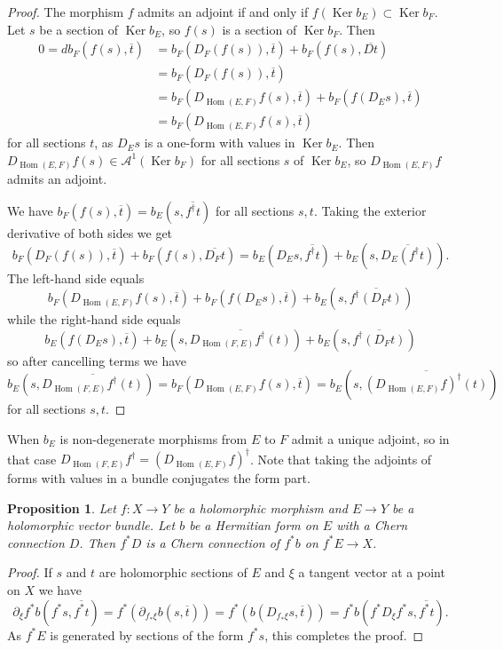 \documentclass[10pt,a4paper]{amsart}
\newtheorem{prop}[theo]{Proposition}
\theoremstyle{definition}
\newcommand{\cc}[1]{\mathcal{#1}}
\def\ov#1{\overline{#1}}
\DeclareMathOperator{\Ker}{Ker}
\DeclareMathOperator{\Hom}{Hom}
\begin{document}
\begin{proof}
The morphism $f$ admits an adjoint if and only if $f(\Ker b_E) \subset \Ker b_F$. Let $s$ be a section of $\Ker b_E$, so $f(s)$ is a section of $\Ker b_F$. Then
\begin{align*}
0 = d b_F(f(s), \ov t)
&= b_F(D_F(f(s)), \ov t) + b_F(f(s), \ov{Dt})
\\
&= b_F(D_F(f(s)), \ov t)
\\
&= b_F(D_{\Hom(E,F)}f(s), \ov t) + b_F(f(D_Es), \ov t)
\\
&= b_F(D_{\Hom(E,F)}f(s), \ov t)
\end{align*}
for all sections $t$, as $D_Es$ is a one-form with values in $\Ker b_E$. Then $D_{\Hom(E,F)} f(s) \in \cc A^1(\Ker b_F)$ for all sections $s$ of $\Ker b_E$, so $D_{\Hom(E,F)}f$ admits an adjoint.

We have $b_F(f(s), \ov{t}) = b_E(s, \ov{f^\dagger t})$ for all sections $s,t$. Taking the exterior derivative of both sides we get
\[
b_F(D_F(f(s)), \ov t) + b_F(f(s), \ov{D_F t})
= b_E(D_E s, \ov {f^\dagger t}) + b_E(s, \ov{D_E(f^\dagger t)}).
\]
The left-hand side equals
\[
b_F(D_{\Hom(E,F)}f(s), \ov t)
+ b_F(f(D_Es), \ov t)
+ b_E(s, \ov{f^\dagger(D_F t)})
\]
while the right-hand side equals
\[
b_E(f(D_E s), \ov t)
+ b_E(s, \ov{D_{\Hom(F,E)}f^\dagger(t)})
+ b_E(s, \ov{f^\dagger(D_F t)})
\]
so after cancelling terms we have
\[
b_E(s, \ov{D_{\Hom(F,E)}f^\dagger(t)})
= b_F(D_{\Hom(E,F)}f(s), \ov t)
= b_E(s, \ov{(D_{\Hom(E,F)}f)^\dagger(t)})
\]
for all sections $s,t$.
\end{proof}

When $b_E$ is non-degenerate morphisms from $E$ to $F$ admit a unique adjoint, so in that case $D_{\Hom(F,E)}f^\dagger = (D_{\Hom(E,F)}f)^\dagger$. Note that taking the adjoints of forms with values in a bundle conjugates the form part.



\begin{prop}
Let $f : X \to Y$ be a holomorphic morphism and $E \to Y$ be a holomorphic vector bundle.
Let $b$ be a Hermitian form on $E$ with a Chern connection $D$.
Then $f^{*}D$ is a Chern connection of $f^{*}b$ on $f^{*}E \to X$.
\end{prop}

\begin{proof}
If $s$ and $t$ are holomorphic sections of $E$ and $\xi$ a tangent vector at a point on $X$ we have
\[
\partial_{\xi} f^{*} b(f^{*}s, \overline{f^{*}t})
= f^{*}(\partial_{f_{*}\xi} b(s, \overline t))
= f^{*}(b(D_{f_{*}\xi}s, \overline{t}))
= f^{*}b(f^{*}D_{\xi} f^{*}s, \overline{f^{*}t}).
\]
As $f^{*}E$ is generated by sections of the form $f^{*}s$, this completes the proof.
\end{proof}
\end{document}
